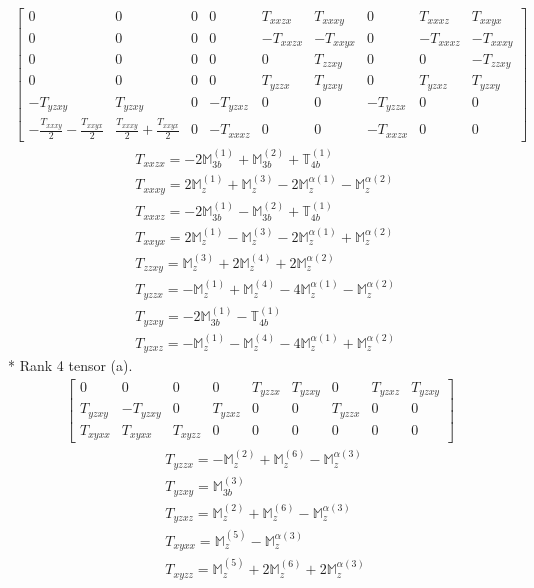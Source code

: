 \documentclass[fleqn,8pt,landscape]{jsarticle}
\begin{document}
\begin{align*}
\begin{bmatrix} 0 & 0 & 0 & 0 & T_{xxzx} & T_{xxxy} & 0 & T_{xxxz} & T_{xxyx} \\ 0 & 0 & 0 & 0 & - T_{xxzx} & - T_{xxyx} & 0 & - T_{xxxz} & - T_{xxxy} \\ 0 & 0 & 0 & 0 & 0 & T_{zzxy} & 0 & 0 & - T_{zzxy} \\ 0 & 0 & 0 & 0 & T_{yzzx} & T_{yzxy} & 0 & T_{yzxz} & T_{yzxy} \\ - T_{yzxy} & T_{yzxy} & 0 & - T_{yzxz} & 0 & 0 & - T_{yzzx} & 0 & 0 \\ - \frac{T_{xxxy}}{2} - \frac{T_{xxyx}}{2} & \frac{T_{xxxy}}{2} + \frac{T_{xxyx}}{2} & 0 & - T_{xxxz} & 0 & 0 & - T_{xxzx} & 0 & 0 \end{bmatrix}
\end{align*}
\begin{align*}
& T_{xxzx} = - 2 \mathbb{M}_{3b}^{(1)} + \mathbb{M}_{3b}^{(2)} + \mathbb{T}_{4b}^{(1)} \\
& T_{xxxy} = 2 \mathbb{M}_{z}^{(1)} + \mathbb{M}_{z}^{(3)} - 2 \mathbb{M}_{z}^{\alpha(1)} - \mathbb{M}_{z}^{\alpha(2)} \\
& T_{xxxz} = - 2 \mathbb{M}_{3b}^{(1)} - \mathbb{M}_{3b}^{(2)} + \mathbb{T}_{4b}^{(1)} \\
& T_{xxyx} = 2 \mathbb{M}_{z}^{(1)} - \mathbb{M}_{z}^{(3)} - 2 \mathbb{M}_{z}^{\alpha(1)} + \mathbb{M}_{z}^{\alpha(2)} \\
& T_{zzxy} = \mathbb{M}_{z}^{(3)} + 2 \mathbb{M}_{z}^{(4)} + 2 \mathbb{M}_{z}^{\alpha(2)} \\
& T_{yzzx} = - \mathbb{M}_{z}^{(1)} + \mathbb{M}_{z}^{(4)} - 4 \mathbb{M}_{z}^{\alpha(1)} - \mathbb{M}_{z}^{\alpha(2)} \\
& T_{yzxy} = - 2 \mathbb{M}_{3b}^{(1)} - \mathbb{T}_{4b}^{(1)} \\
& T_{yzxz} = - \mathbb{M}_{z}^{(1)} - \mathbb{M}_{z}^{(4)} - 4 \mathbb{M}_{z}^{\alpha(1)} + \mathbb{M}_{z}^{\alpha(2)}
\end{align*}
* Rank 4 tensor (a).
\begin{align*}
\begin{bmatrix} 0 & 0 & 0 & 0 & T_{yzzx} & T_{yzxy} & 0 & T_{yzxz} & T_{yzxy} \\ T_{yzxy} & - T_{yzxy} & 0 & T_{yzxz} & 0 & 0 & T_{yzzx} & 0 & 0 \\ T_{xyxx} & T_{xyxx} & T_{xyzz} & 0 & 0 & 0 & 0 & 0 & 0 \end{bmatrix}
\end{align*}
\begin{align*}
& T_{yzzx} = - \mathbb{M}_{z}^{(2)} + \mathbb{M}_{z}^{(6)} - \mathbb{M}_{z}^{\alpha(3)} \\
& T_{yzxy} = \mathbb{M}_{3b}^{(3)} \\
& T_{yzxz} = \mathbb{M}_{z}^{(2)} + \mathbb{M}_{z}^{(6)} - \mathbb{M}_{z}^{\alpha(3)} \\
& T_{xyxx} = \mathbb{M}_{z}^{(5)} - \mathbb{M}_{z}^{\alpha(3)} \\
& T_{xyzz} = \mathbb{M}_{z}^{(5)} + 2 \mathbb{M}_{z}^{(6)} + 2 \mathbb{M}_{z}^{\alpha(3)}
\end{align*}
\end{document}
